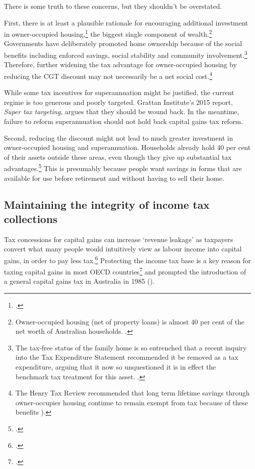 There is some truth to these concerns, but they shouldn’t be overstated. 

First, there is at least a plausible rationale\label{subsubsect:plausible-rational-for-encouraging-investment-in-owner-occupied-housing}
 for encouraging additional investment in owner-occupied housing,\footcite[][43--45]{DaleyMcGannonSavageEtAl2013BalancingBudgets} the biggest single component of wealth.\footnote{Owner-occupied housing (net of property loans) is almost 40 per cent of the net worth of Australian households. \textcite[See:][]{ABS2015HousingFinance}.} Governments have deliberately promoted home ownership because of the social benefits including enforced savings, social stability and community involvement.\footnote{The tax-free status of the family home is so entrenched that a recent inquiry into the Tax Expenditure Statement recommended it be removed as a tax expenditure, arguing that it now so unquestioned it is in effect the benchmark tax treatment for this asset. \textcite[][42]{HouseOfRepresentativesStandingCommitteeonTaxRevenue2015TES}.} Therefore, further widening the tax advantage for owner-occupied housing by reducing the CGT discount may not necessarily be a net social cost.\footnote{The Henry Tax Review recommended that long term lifetime savings through owner-occupier housing continue to remain exempt from tax because of these benefits \textcite[][Part A, p.~4]{HenryTaxReview2010}).}


While some tax incentives for superannuation might be justified, the current regime is too generous and poorly targeted. Grattan Institute’s 2015 report, \textit{Super tax targeting}, argues that they should be wound back. %
In the meantime, failure to reform superannuation should not hold back capital gains tax reform. 

Second, reducing the discount might not lead to much greater investment in owner-occupied housing and superannuation. Households already hold 40 per cent of their assets outside these areas, even though they give up substantial tax advantages.\footcite{ABS2015HousingFinance} This is presumably because people want savings in forms that are available for use before retirement and without having to sell their home.  


\subsection{Maintaining the integrity of income tax collections}
Tax concessions for capital gains can increase ‘revenue leakage’ as taxpayers convert what many people would intuitively view as labour income into capital gains, in order to pay less tax.\footcites{Evans2005}{MinasLim2013} Protecting the income tax base is a key reason for taxing capital gains in most OECD countries\footcite{OECD2006TaxationOfCapitalGains}  and prompted the introduction of a general capital gains tax in Australia in 1985 (). 

